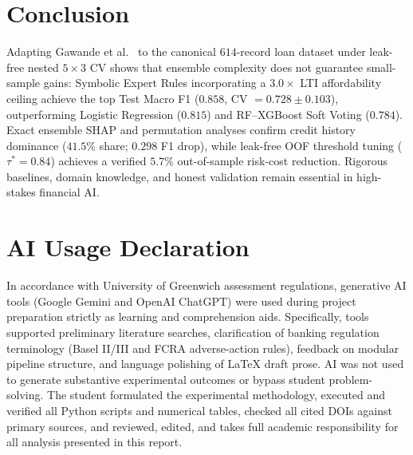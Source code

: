 \documentclass{COMPXXXX}
\begin{document}
\section{Conclusion}
\label{sec:conclusion}
Adapting Gawande et al.~\cite{gawande2026} to the canonical $614$-record loan dataset under leak-free nested $5\times 3$ CV shows that ensemble complexity does not guarantee small-sample gains: Symbolic Expert Rules incorporating a $3.0\times$ LTI affordability ceiling achieve the top Test Macro F1 ($0.858$, CV $=0.728 \pm 0.103$), outperforming Logistic Regression ($0.815$) and RF--XGBoost Soft Voting ($0.784$). Exact ensemble SHAP and permutation analyses confirm credit history dominance ($41.5\%$ share; $0.298$ F1 drop), while leak-free OOF threshold tuning ($\tau^*=0.84$) achieves a verified $5.7\%$ out-of-sample risk-cost reduction. Rigorous baselines, domain knowledge, and honest validation remain essential in high-stakes financial AI.

\section*{AI Usage Declaration}
In accordance with University of Greenwich assessment regulations, generative AI tools (Google Gemini and OpenAI ChatGPT) were used during project preparation strictly as learning and comprehension aids. Specifically, tools supported preliminary literature searches, clarification of banking regulation terminology (Basel II/III and FCRA adverse-action rules), feedback on modular pipeline structure, and language polishing of LaTeX draft prose. AI was not used to generate substantive experimental outcomes or bypass student problem-solving. The student formulated the experimental methodology, executed and verified all Python scripts and numerical tables, checked all cited DOIs against primary sources, and reviewed, edited, and takes full academic responsibility for all analysis presented in this report.


\end{document}
